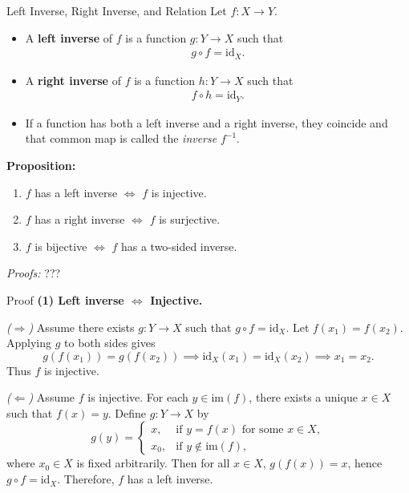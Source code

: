 \begin{frame}{Left Inverse, Right Inverse, and Relation}
Let \(f: X \to Y\).

\begin{itemize}
  \item A \textbf{left inverse} of \(f\) is a function \(g: Y \to X\) such that
  \begin{align*}
    g \circ f = \mathrm{id}_X.
  \end{align*}
  \item A \textbf{right inverse} of \(f\) is a function \(h: Y \to X\) such that
  \begin{align*}
    f \circ h = \mathrm{id}_Y.
  \end{align*}
  \item If a function has both a left inverse and a right inverse, they coincide and that common map is called the \emph{inverse} \(f^{-1}\).
\end{itemize}


\textbf{Proposition:}
\begin{enumerate}
  \item \(f\) has a left inverse \(\iff\) \(f\) is injective.
  \item \(f\) has a right inverse \(\iff\) \(f\) is surjective.
  \item \(f\) is bijective \(\iff\) \(f\) has a two-sided inverse.
\end{enumerate}

\emph{Proofs:} ???
\end{frame}

\begin{frame}{Proof }
\textbf{(1) Left inverse $\Leftrightarrow$ Injective.}

\emph{($\Rightarrow$)}  
Assume there exists \(g:Y\to X\) such that \(g\circ f = \mathrm{id}_X.\)  
Let \(f(x_1)=f(x_2)\). Applying \(g\) to both sides gives
\[
g(f(x_1)) = g(f(x_2)) \implies \mathrm{id}_X(x_1) = \mathrm{id}_X(x_2) \implies x_1 = x_2.
\]
Thus \(f\) is injective.

\emph{($\Leftarrow$)}  
Assume \(f\) is injective.  
For each \(y\in\mathrm{im}(f)\), there exists a unique \(x\in X\) such that \(f(x)=y\).  
Define \(g:Y\to X\) by
\[
g(y) =
\begin{cases}
x, & \text{if } y=f(x)\text{ for some }x\in X,\\[4pt]
x_0, & \text{if } y\notin\mathrm{im}(f),
\end{cases}
\]
where \(x_0\in X\) is fixed arbitrarily.  
Then for all \(x\in X\), \(g(f(x))=x\), hence \(g\circ f=\mathrm{id}_X.\)  
Therefore, \(f\) has a left inverse.

\end{frame}


